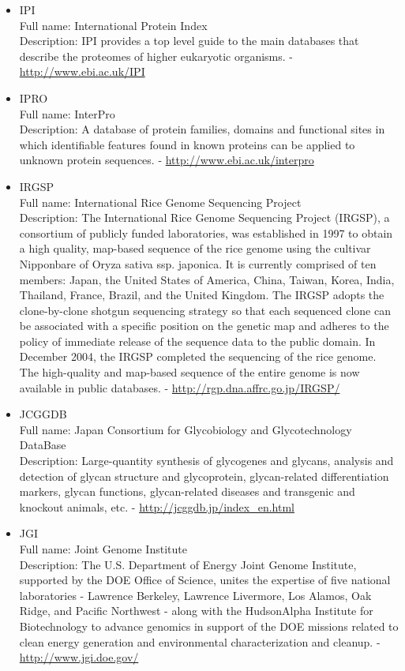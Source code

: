 \begin{itemize}
\item{IPI}\\ Full name: International Protein Index\\ Description: IPI provides a top level guide to the main databases that describe the proteomes of higher eukaryotic organisms. - 
\url{http://www.ebi.ac.uk/IPI}

\item{IPRO}\\ Full name: InterPro\\ Description: A database of protein families, domains and functional sites in which identifiable features found in known proteins can be applied to unknown protein sequences. - 
\url{http://www.ebi.ac.uk/interpro}

\item{IRGSP}\\ Full name: International Rice Genome Sequencing Project\\ Description: The International Rice Genome Sequencing Project (IRGSP), a consortium of publicly funded laboratories, was established in 1997 to obtain a high quality, map-based sequence of the rice genome using the cultivar Nipponbare of Oryza sativa ssp. japonica. It is currently comprised of ten members: Japan, the United States of America, China, Taiwan, Korea, India, Thailand, France, Brazil, and the United Kingdom. The IRGSP adopts the clone-by-clone shotgun sequencing strategy so that each sequenced clone can be associated with a specific position on the genetic map and adheres to the policy of immediate release of the sequence data to the public domain. In December 2004, the IRGSP completed the sequencing of the rice genome. The high-quality and map-based sequence of the entire genome is now available in public databases. - 
\url{http://rgp.dna.affrc.go.jp/IRGSP/}

\item{JCGGDB}\\ Full name: Japan Consortium for Glycobiology and Glycotechnology DataBase\\ Description: Large-quantity synthesis of glycogenes and glycans, analysis and detection of glycan structure and glycoprotein, glycan-related differentiation markers, glycan functions, glycan-related diseases and transgenic and knockout animals, etc. - 
\url{http://jcggdb.jp/index\_en.html}

\item{JGI}\\ Full name: Joint Genome Institute\\ Description: The U.S. Department of Energy Joint Genome Institute, supported by the DOE Office of Science, unites the expertise of five national laboratories - Lawrence Berkeley, Lawrence Livermore, Los Alamos, Oak Ridge, and Pacific Northwest - along with the HudsonAlpha Institute for Biotechnology to advance genomics in support of the DOE missions related to clean energy generation and environmental characterization and cleanup. - 
\url{http://www.jgi.doe.gov/}


\end{itemize}
